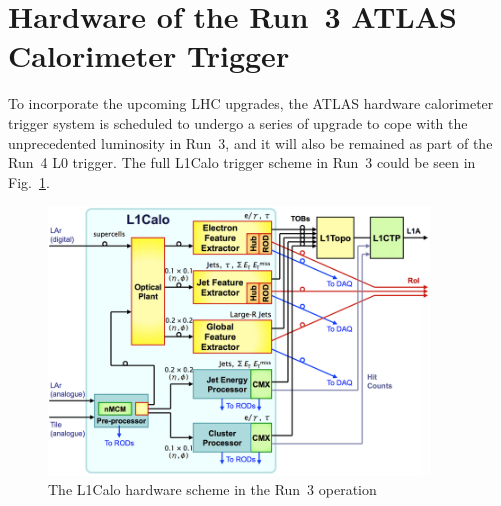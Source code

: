 \section{Hardware of the Run~3 ATLAS Calorimeter Trigger}
To incorporate the upcoming LHC upgrades, the ATLAS hardware calorimeter trigger system is scheduled to undergo a series of upgrade to cope with the unprecedented luminosity in Run~3, and it will also be remained as part of the Run~4 L0 trigger. The full L1Calo trigger scheme in Run~3 could be seen in Fig.~\ref{Fig:l1calo_scheme}.
\begin{figure}[!h]                
	\includegraphics[width=0.9\textwidth]{Chapter6/L1Calo.png}
	\begin{center}
		\caption{The L1Calo hardware scheme in the Run~3 operation\cite{Schwienhorst:2016efd}}
		\label{Fig:l1calo_scheme}            
	\end{center}
\end{figure}
\noindent
